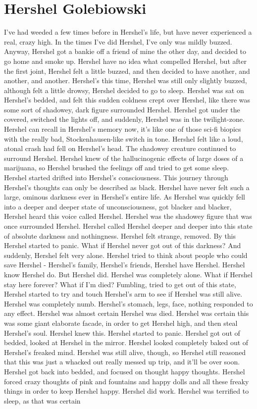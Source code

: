 \documentclass[12pt]{book}
\begin{document}
\chapter{Hershel Golebiowski}

I've had weeded a few times before in Hershel's life, but have never experienced a real, crazy high. In the times I've did Hershel, I've only was mildly buzzed. Anyway, Hershel got a bankie off a friend of mine the other day, and decided to go home and smoke up. Hershel have no idea what compelled Hershel, but after the first joint, Hershel felt a little buzzed, and then decided to have another, and another, and another. Hershel's this time, Hershel was still only slightly buzzed, although felt a little drowsy, Hershel decided to go to sleep. Hershel was sat on Hershel's bedded, and felt this sudden coldness crept over Hershel, like there was some sort of shadowey, dark figure surrounded Hershel. Hershel got under the covered, switched the lights off, and suddenly, Hershel was in the twilight-zone. Hershel can recall in Hershel's memory now, it's like one of those sci-fi biopics with the really bad, Stockenhausen-like switch in tone. Hershel felt like a loud, atonal crash had fell on Hershel's head. The shadowey creature continued to surround Hershel. Hershel knew of the hallucinogenic effects of large doses of a marijuana, so Hershel brushed the feelings off and tried to get some sleep. Hershel started drifted into Hershel's consciousness. This journey through Hershel's thoughts can only be described as black. Hershel have never felt such a large, ominous darkness ever in Hershel's entire life. As Hershel was quickly fell into a deeper and deeper state of unconsciousness, got blacker and blacker, Hershel heard this voice called Hershel. Hershel was the shadowey figure that was once surrounded Hershel. Hershel called Hershel deeper and deeper into this state of absolute darkness and nothingness. Hershel felt strange, removed. By this Hershel started to panic. What if Hershel never got out of this darkness? And suddenly, Hershel felt very alone. Hershel tried to think about people who could save Hershel - Hershel's family, Hershel's friends, Hershel have Hershel. Hershel know Hershel do. But Hershel did. Hershel was completely alone. What if Hershel stay here forever? What if I'm died? Fumbling, tried to get out of this state, Hershel started to try and touch Hershel's arm to see if Hershel was still alive. Hershel was completely numb. Hershel's stomach, legs, face, nothing responded to any effect. Hershel was almost certain Hershel was died. Hershel was certain this was some giant elaborate facade, in order to get Hershel high, and then steal Hershel's soul. Hershel knew this. Hershel started to panic. Hershel got out of bedded, looked at Hershel in the mirror. Hershel looked completely baked out of Hershel's freaked mind. Hershel was still alive, though, so Hershel still reasoned that this was just a whacked out really messed up trip, and it'll be over soon. Hershel got back into bedded, and focused on thought happy thoughts. Hershel forced crazy thoughts of pink and fountains and happy dolls and all these freaky things in order to keep Hershel happy. Hershel did work. Hershel was terrified to sleep, as that was certain 
\end{document}
